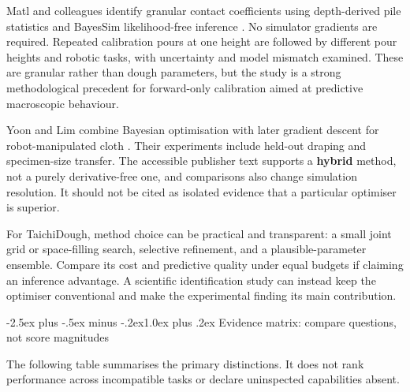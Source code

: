 \documentclass[
  11pt,
]{article}
\makeatletter
\renewcommand\subsection{\needspace{5\baselineskip}\@startsection{subsection}{2}{\z@}%
  {-2.5ex plus -.5ex minus -.2ex}{1.0ex plus .2ex}%
  {\normalfont\sffamily\large\bfseries\color{accent}}}
\makeatother
\begin{document}
Matl and colleagues identify granular contact coefficients using
depth-derived pile statistics and BayesSim likelihood-free inference
. No simulator gradients are required.
Repeated calibration pours at one height are followed by different pour
heights and robotic tasks, with uncertainty and model mismatch examined.
These are granular rather than dough parameters, but the study is a
strong methodological precedent for forward-only calibration aimed at
predictive macroscopic behaviour.

Yoon and Lim combine Bayesian optimisation with later gradient descent
for robot-manipulated cloth . Their
experiments include held-out draping and specimen-size transfer. The
accessible publisher text supports a \textbf{hybrid} method, not a
purely derivative-free one, and comparisons also change simulation
resolution. It should not be cited as isolated evidence that a
particular optimiser is superior.

For TaichiDough, method choice can be practical and transparent: a small
joint grid or space-filling search, selective refinement, and a
plausible-parameter ensemble. Compare its cost and predictive quality
under equal budgets if claiming an inference advantage. A scientific
identification study can instead keep the optimiser conventional and
make the experimental finding its main contribution.

\subsection{Evidence matrix: compare questions, not score
magnitudes}\label{evidence-matrix-compare-questions-not-score-magnitudes}

The following table summarises the primary distinctions. It does not
rank performance across incompatible tasks or declare uninspected
capabilities absent.
\end{document}
